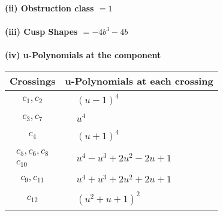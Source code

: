 \documentclass[1p]{elsarticle_modified}
\theoremstyle{definition}
\begin{document}
\flushleft \textbf{(ii) Obstruction class $= 1$}\\~\\
\flushleft \textbf{(iii) Cusp Shapes $= -4 b^3-4 b$}\\~\\
\newpage\renewcommand{\arraystretch}{1}
\flushleft \textbf{(iv) u-Polynomials at the component}\newline \\
\begin{tabular}{m{50pt}|m{274pt}}
Crossings & \hspace{64pt}u-Polynomials at each crossing \\
\hline $$\begin{aligned}c_{1},c_{2}\end{aligned}$$&$\begin{aligned}
&(u-1)^4
\end{aligned}$\\
\hline $$\begin{aligned}c_{3},c_{7}\end{aligned}$$&$\begin{aligned}
&u^4
\end{aligned}$\\
\hline $$\begin{aligned}c_{4}\end{aligned}$$&$\begin{aligned}
&(u+1)^4
\end{aligned}$\\
\hline $$\begin{aligned}c_{5},c_{6},c_{8}\\c_{10}\end{aligned}$$&$\begin{aligned}
&u^4- u^3+2 u^2-2 u+1
\end{aligned}$\\
\hline $$\begin{aligned}c_{9},c_{11}\end{aligned}$$&$\begin{aligned}
&u^4+u^3+2 u^2+2 u+1
\end{aligned}$\\
\hline $$\begin{aligned}c_{12}\end{aligned}$$&$\begin{aligned}
&(u^2+u+1)^2
\end{aligned}$\\
\hline
\end{tabular}\\~\\
\end{document}

